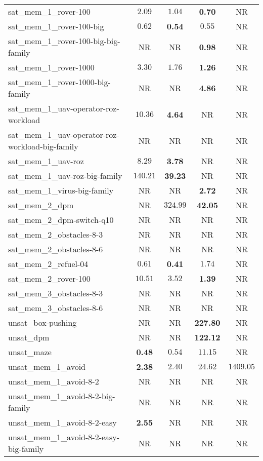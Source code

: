 \begin{tabular}{lcccc}
sat\_mem\_1\_rover-100 & $2.09$ & $1.04$ & \textbf{0.70} & NR \\
sat\_mem\_1\_rover-100-big & $0.62$ & \textbf{0.54} & $0.55$ & NR \\
sat\_mem\_1\_rover-100-big-big-family & NR & NR & \textbf{0.98} & NR \\
sat\_mem\_1\_rover-1000 & $3.30$ & $1.76$ & \textbf{1.26} & NR \\
sat\_mem\_1\_rover-1000-big-family & NR & NR & \textbf{4.86} & NR \\
sat\_mem\_1\_uav-operator-roz-workload & $10.36$ & \textbf{4.64} & NR & NR \\
sat\_mem\_1\_uav-operator-roz-workload-big-family & NR & NR & NR & NR \\
sat\_mem\_1\_uav-roz & $8.29$ & \textbf{3.78} & NR & NR \\
sat\_mem\_1\_uav-roz-big-family & $140.21$ & \textbf{39.23} & NR & NR \\
sat\_mem\_1\_virus-big-family & NR & NR & \textbf{2.72} & NR \\
sat\_mem\_2\_dpm & NR & $324.99$ & \textbf{42.05} & NR \\
sat\_mem\_2\_dpm-switch-q10 & NR & NR & NR & NR \\
sat\_mem\_2\_obstacles-8-3 & NR & NR & NR & NR \\
sat\_mem\_2\_obstacles-8-6 & NR & NR & NR & NR \\
sat\_mem\_2\_refuel-04 & $0.61$ & \textbf{0.41} & $1.74$ & NR \\
sat\_mem\_2\_rover-100 & $10.51$ & $3.52$ & \textbf{1.39} & NR \\
sat\_mem\_3\_obstacles-8-3 & NR & NR & NR & NR \\
sat\_mem\_3\_obstacles-8-6 & NR & NR & NR & NR \\
unsat\_box-pushing & NR & NR & \textbf{227.80} & NR \\
unsat\_dpm & NR & NR & \textbf{122.12} & NR \\
unsat\_maze & \textbf{0.48} & $0.54$ & $11.15$ & NR \\
unsat\_mem\_1\_avoid & \textbf{2.38} & $2.40$ & $24.62$ & $1409.05$ \\
unsat\_mem\_1\_avoid-8-2 & NR & NR & NR & NR \\
unsat\_mem\_1\_avoid-8-2-big-family & NR & NR & NR & NR \\
unsat\_mem\_1\_avoid-8-2-easy & \textbf{2.55} & NR & NR & NR \\
unsat\_mem\_1\_avoid-8-2-easy-big-family & NR & NR & NR & NR \\

\end{tabular}
